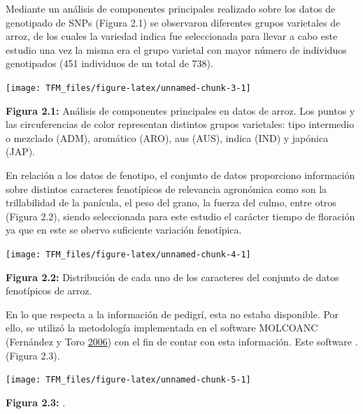 \documentclass[11pt,spanish,a4paper,oneside,]{book} %
\begin{document}
Mediante un análisis de componentes principales realizado sobre los datos de genotipado de SNPs (Figura 2.1) se observaron diferentes grupos varietales de arroz, de los cuales la variedad indica fue seleccionada para llevar a cabo este estudio una vez la misma era el grupo varietal con mayor número de individuos genotipados (451 individuos de un total de 738).

\begin{center}\texttt{[image: TFM\_files/figure-latex/unnamed-chunk-3-1]} \end{center}

\begin{center}
\textbf{Figura 2.1:} Análisis de componentes principales en datos de arroz. Los puntos y las circuferencias de color representan distintos grupos varietales: tipo intermedio o mezclado (ADM), aromático (ARO), aus (AUS), indica (IND) y japónica (JAP).

\end{center}

En relación a los datos de fenotipo, el conjunto de datos proporciono información sobre distintos caracteres fenotípicos de relevancia agronómica como son la trillabilidad de la panícula, el peso del grano, la fuerza del culmo, entre otros (Figura 2.2), siendo seleccionada para este estudio el carácter tiempo de floración ya que en este se obervo suficiente variación fenotípica.

\begin{center}\texttt{[image: TFM\_files/figure-latex/unnamed-chunk-4-1]} \end{center}

\begin{center}
\textbf{Figura 2.2:} Distribución de cada uno de los caracteres del conjunto de datos fenotípicos de arroz.

\end{center}

En lo que respecta a la información de pedigrí, esta no estaba disponible. Por ello, se utilizó la metodología implementada en el software MOLCOANC (Fernández y Toro \protect\hyperlink{ref-cite:24}{2006}) con el fin de contar con esta información. Este software . (Figura 2.3).

\begin{center}\texttt{[image: TFM\_files/figure-latex/unnamed-chunk-5-1]} \end{center}

\begin{center}
\textbf{Figura 2.3:} .

\end{center}
\end{document}
